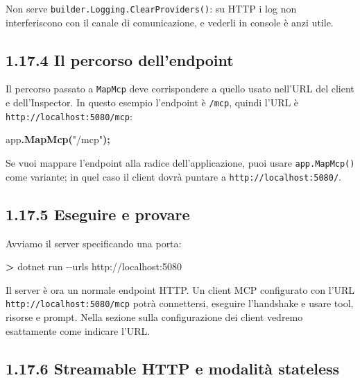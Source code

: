 \documentclass[
  italian,
  10pt,
]{book}
\newenvironment{Shaded}{\begin{snugshade}}{\end{snugshade}}
\newcommand{\AttributeTok}[1]{\textcolor[rgb]{0.13,0.29,0.53}{#1}}
\newcommand{\ExtensionTok}[1]{#1}
\newcommand{\FunctionTok}[1]{\textcolor[rgb]{0.13,0.29,0.53}{\textbf{#1}}}
\newcommand{\NormalTok}[1]{#1}
\newcommand{\OperatorTok}[1]{\textcolor[rgb]{0.81,0.36,0.00}{\textbf{#1}}}
\newcommand{\StringTok}[1]{\textcolor[rgb]{0.31,0.60,0.02}{#1}}
\begin{document}
Non serve \texttt{builder.Logging.ClearProviders()}: su HTTP i log non
interferiscono con il canale di comunicazione, e vederli in console è
anzi utile.

\subsection{1.17.4 Il percorso
dell'endpoint}\label{il-percorso-dellendpoint}

Il percorso passato a \texttt{MapMcp} deve corrispondere a quello usato
nell'URL del client e dell'Inspector. In questo esempio l'endpoint è
\texttt{/mcp}, quindi l'URL è \texttt{http://localhost:5080/mcp}:

\begin{Shaded}
\begin{Highlighting}[]
\NormalTok{app}\OperatorTok{.}\FunctionTok{MapMcp}\OperatorTok{(}\StringTok{"/mcp"}\OperatorTok{);}
\end{Highlighting}
\end{Shaded}

Se vuoi mappare l'endpoint alla radice dell'applicazione, puoi usare
\texttt{app.MapMcp()} come variante; in quel caso il client dovrà
puntare a \texttt{http://localhost:5080/}.

\subsection{1.17.5 Eseguire e provare}\label{eseguire-e-provare}

Avviamo il server specificando una porta:

\begin{Shaded}
\begin{Highlighting}[]
\OperatorTok{\textgreater{}}\NormalTok{ dotnet }\ExtensionTok{run} \AttributeTok{{-}{-}urls}\NormalTok{ http://localhost:5080}
\end{Highlighting}
\end{Shaded}

Il server è ora un normale endpoint HTTP. Un client MCP configurato con
l'URL \texttt{http://localhost:5080/mcp} potrà connettersi, eseguire
l'handshake e usare tool, risorse e prompt. Nella sezione sulla
configurazione dei client vedremo esattamente come indicare l'URL.

\subsection{1.17.6 Streamable HTTP e modalità
stateless}\label{streamable-http-e-modalituxe0-stateless}
\end{document}
